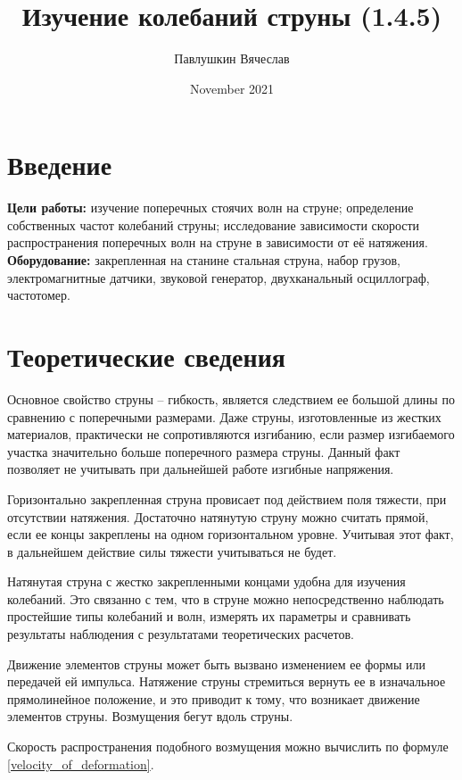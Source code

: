 \documentclass[a4paper,12pt]{article}
\title{\textbf{Изучение колебаний струны (1.4.5)}}
\author{Павлушкин Вячеслав}
\date{November 2021}
\begin{document}
	
	\maketitle
	
	\section{Введение}
	
	\textbf{Цели работы:} изучение поперечных стоячих волн на струне; определение собственных частот колебаний струны; исследование зависимости скорости распространения поперечных волн на струне в зависимости от её натяжения.\\
	\textbf{Оборудование:} закрепленная на станине стальная струна, набор грузов,
	электромагнитные датчики, звуковой генератор, двухканальный осциллограф, частотомер.
	
	\section{Теоретические сведения}
	
	Основное свойство струны -- гибкость, является следствием ее большой длины по сравнению с поперечными размерами. Даже струны, изготовленные из жестких материалов, практически не сопротивляются изгибанию, если размер изгибаемого участка значительно больше поперечного размера струны. Данный факт позволяет не учитывать при дальнейшей работе изгибные напряжения.
	
	Горизонтально закрепленная струна провисает под действием поля тяжести, при отсутствии натяжения. Достаточно натянутую струну можно считать прямой, если ее концы закреплены на одном горизонтальном уровне. Учитывая этот факт, в дальнейшем действие силы тяжести учитываться не будет.
	
	Натянутая струна с жестко закрепленными концами удобна для изучения колебаний. Это связанно с тем, что в струне можно непосредственно наблюдать простейшие типы колебаний и волн, измерять их параметры и сравнивать результаты наблюдения с результатами теоретических расчетов.
	
	Движение элементов струны может быть вызвано изменением ее формы или передачей ей импульса. Натяжение струны стремиться вернуть ее в изначальное прямолинейное положение, и это приводит к тому, что возникает движение элементов струны. Возмущения бегут вдоль струны.
	
	Скорость распространения подобного возмущения можно вычислить по формуле \eqref{velocity_of_deformation}.
	
\end{document}
